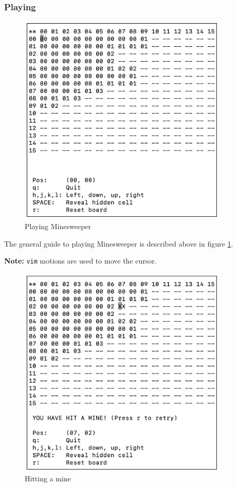 \documentclass[12pt]{article}
\begin{document}
\subsubsection{Playing}

\begin{figure}[H]
    \centering
    \includegraphics[width=10cm]{./images/playing-minesweeper.png}
    \caption{Playing Minesweeper}
    \label{playing-minesweeper}
\end{figure}

The general guide to playing Minesweeper is described above in
figure \ref{playing-minesweeper}.

\textbf{Note:} \texttt{vim} motions are used to move the cursor.

\begin{figure}[H]
    \centering
    \includegraphics[width=10cm]{./images/hitting-mine-minesweeper.png}
    \caption{Hitting a mine}
    \label{hitting-mine-minesweeper}
\end{figure}
\end{document}
